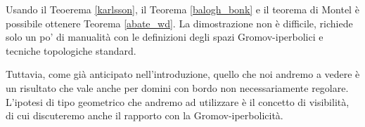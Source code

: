 Usando il Teoerema \ref{karlsson}, il Teorema \ref{balogh_bonk} e il teorema di Montel è possibile ottenere Teorema \ref{abate_wd}. La dimostrazione non è difficile, richiede solo un po' di manualità con le definizioni degli spazi Gromov-iperbolici e tecniche topologiche standard.

Tuttavia, come già anticipato nell'introduzione, quello che noi andremo a vedere è un risultato che vale anche per domini con bordo non necessariamente regolare. L'ipotesi di tipo geometrico che andremo ad utilizzare è il concetto di visibilità, di cui discuteremo anche il rapporto con la Gromov-iperbolicità.